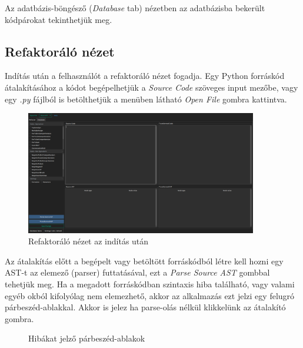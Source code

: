 Az adatbázis-böngésző (\emph{Database} tab) nézetben az adatbázisba bekerült kódpárokat tekinthetjük meg.

\subsection{Refaktoráló nézet}

Indítás után a felhasználót a refaktoráló nézet fogadja.
Egy Python forráskód átalakításához a kódot begépelhetjük a \emph{Source Code} szöveges input mezőbe,
vagy egy \emph{.py} fájlból is betölthetjük a menüben látható \emph{Open File} gombra kattintva.

\begin{figure}[H]
	\centering
	\includegraphics[width=0.9\textwidth]{images/screenshots/refactor_tab_1.png}
	\caption{Refaktoráló nézet az indítás után}
\end{figure}

Az átalakítás előtt a begépelt vagy betöltött forráskódból létre kell hozni egy AST-t
az elemező (parser) futtatásával,
ezt a \emph{Parse Source AST} gombbal tehetjük meg. Ha a megadott forráskódban szintaxis hiba található, 
vagy valami egyéb okból kifolyólag nem elemezhető, akkor az alkalmazás ezt jelzi egy felugró 
párbeszéd-ablakkal. Akkor is jelez ha parse-olás nélkül klikkelünk az átalakító gombra.

\begin{figure}[H]
	\centering
	\hspace{5pt}
	\caption{Hibákat jelző párbeszéd-ablakok}
\end{figure}

